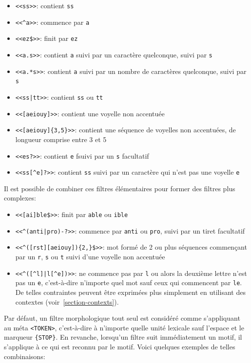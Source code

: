 \begin{itemize}
  \item \verb$<<ss>>$: contient \verb$ss$
  \item \verb$<<^a>>$: commence par \verb$a$
  \item \verb+<<ez$>>+: finit par \verb$ez$
  \item \verb$<<a.s>>$: contient \verb$a$ suivi par un caractère quelconque, suivi par \verb$s$
  \item \verb$<<a.*s>>$: contient \verb$a$ suivi par un nombre de caractères quelconque, suivi par \verb$s$
  \item \verb$<<ss|tt>>$: contient \verb$ss$ ou \verb$tt$
  \item \verb$<<[aeiouy]>>$: contient une voyelle non accentuée
  \item \verb$<<[aeiouy]{3,5}>>$: contient une séquence de voyelles non accentuées, de longueur comprise entre 3 et 5
  \item \verb$<<es?>>$: contient \verb$e$ fsuivi par un \verb$s$ facultatif
  \item \verb$<<ss[^e]?>>$: contient \verb$ss$ suivi par un caractère qui n’est pas une voyelle \verb$e$
\end{itemize}

\bigskip
\noindent Il est possible de combiner ces filtres élémentaires pour former des filtres plus complexes:

\begin{itemize}
\item \verb+<<[ai]ble$>>+: finit par \verb$able$ ou \verb$ible$
\item \verb$<<^(anti|pro)-?>>$: commence par \verb$anti$ ou \verb$pro$, suivi par un tiret facultatif
  \item \verb+<<^([rst][aeiouy]){2,}$>>+: mot formé de 2 ou plus séquences commençant par un 
  	\verb$r$, \verb$s$ ou \verb$t$ suivi d’une voyelle non accentuée
  \item \verb!<<^([^l]|l[^e])>>!: ne commence pas par \verb$l$ ou alors la deuxième lettre n’est pas
un \verb$e$, c’est-à-dire n’importe quel mot sauf ceux qui commencent par \verb$le$.                                                                           De telles contraintes peuvent être exprimées plus simplement en utilisant des contextes
(voir~\ref{section-contexts}).
\end{itemize}

\noindent Par défaut, un filtre morphologique tout seul est considéré comme s’appliquant au méta
\verb$<TOKEN>$, c’est-à-dire à n’importe quelle unité lexicale sauf l’espace et le marqueur
\verb+{STOP}+.
En revanche, lorsqu’un filtre suit immédiatement un motif, il s’applique à ce qui est reconnu par
le motif. Voici quelques exemples de telles combinaisons:


